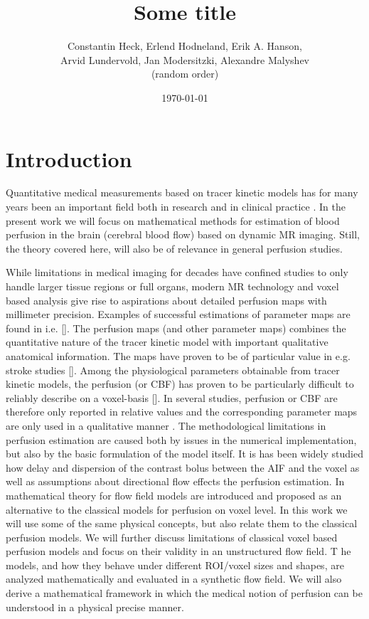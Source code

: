 \documentclass[paper=a4, fontsize=11pt,parskip=half,headings=small]{scrartcl}
\title{Some title}
\author{Constantin Heck, Erlend Hodneland, Erik A. Hanson, \\ Arvid Lundervold, Jan Modersitzki, Alexandre Malyshev \\ (random order)}
\date{\today}
\begin{document}
	\maketitle
	\tableofcontents

	
	\section{Introduction}
	
	Quantitative medical measurements based on tracer kinetic models has for many years been an important field both in research and in clinical practice \cite{zierler62,axel80,zierler00}. 
	In the present work we will focus on mathematical methods for estimation of blood perfusion in the brain (cerebral blood flow) based on dynamic MR imaging. 
	Still, the theory covered here, will also be of relevance in general perfusion studies.

	While limitations in medical imaging for decades have confined studies to only handle larger tissue regions or full organs, modern MR technology and voxel based analysis give rise to aspirations about detailed perfusion maps with millimeter precision.  
	Examples of successful estimations of parameter maps are found in i.e. []. 
	The perfusion maps (and other parameter maps) combines the quantitative nature of the tracer kinetic model with important qualitative anatomical information. 
	The maps have proven to be of particular value in e.g. stroke studies []. 
	Among the physiological parameters obtainable from tracer kinetic models, the perfusion (or CBF) has proven to be particularly difficult to reliably describe on a voxel-basis [].  
	In several studies, perfusion or CBF are therefore only reported in relative values and the corresponding parameter maps are only used in a qualitative manner \cite{calamante99}.
	The methodological limitations in perfusion estimation are caused both by issues in the numerical implementation, but also by the basic formulation of the model itself.  
	It is has been widely studied how delay and dispersion of the contrast bolus between the AIF and the voxel as well as assumptions about directional flow \cite{thacker03,sourbron14} effects the perfusion estimation. 
	In \cite{sourbron14} mathematical theory for flow field models are introduced and proposed as an alternative to the classical models for perfusion on voxel level. 
	In this work we will use some of the same physical concepts, but also relate them to the classical perfusion models.  
	We will further discuss limitations of classical voxel based perfusion models and focus on their validity in an unstructured flow field. T
	he models, and how they behave under different ROI/voxel sizes and shapes, are analyzed mathematically and evaluated in a synthetic flow field.  
	We will also derive a mathematical framework in which the medical notion of perfusion can be understood in a physical precise manner.
\end{document}
